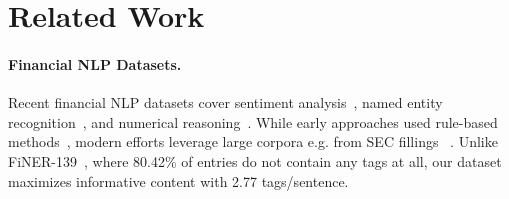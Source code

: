 \section{Related Work}
\paragraph{Financial NLP Datasets.}
Recent financial NLP datasets cover sentiment analysis~\citep{gupta2020comprehensive}, named entity recognition~\citep{alvarado2015domain, shah2022fluemeetsflangbenchmarks}, and numerical reasoning~\citep{chen2022finqadatasetnumericalreasoning}.
While early approaches used rule-based methods~\citep{extraction2007, sheikh2012rule, hutto2014vader}, modern efforts leverage large corpora e.g. from SEC fillings ~\citep{loukas2021edgar}. 
Unlike FiNER-139~\citep{loukas-etal-2022-finer}, where 80.42\% of entries do not contain any tags at all, our dataset maximizes informative content with 2.77 tags/sentence.


